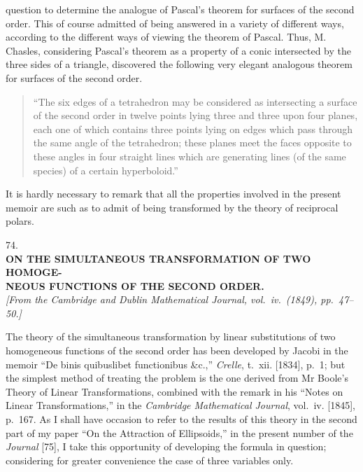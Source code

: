\documentclass[10pt]{article}
\newcommand{\qedpage}{\vfill\pagebreak}
\begin{document}
question to determine the analogue of Pascal's theorem for surfaces of the second
order. This of course admitted of being answered in a variety of different ways,
according to the different ways of viewing the theorem of Pascal. Thus, M. Chasles,
considering Pascal's theorem as a property of a conic intersected by the three sides
of a triangle, discovered the following very elegant analogous theorem for surfaces of
the second order.

\begin{quote}
``The six edges of a tetrahedron may be considered as intersecting a surface of the
second order in twelve points lying three and three upon four planes, each one of
which contains three points lying on edges which pass through the same angle of the
tetrahedron; these planes meet the faces opposite to these angles in four straight
lines which are generating lines (of the same species) of a certain hyperboloid.''
\end{quote}

It is hardly necessary to remark that all the properties involved in the present
memoir are such as to admit of being transformed by the theory of reciprocal polars.
\qedpage

\begin{center}
{\Large 74.}\\[2em]
{\large\bfseries ON THE SIMULTANEOUS TRANSFORMATION OF TWO HOMOGE-}\\
{\large\bfseries NEOUS FUNCTIONS OF THE SECOND ORDER.}\\[1.5em]
\textit{[From the Cambridge and Dublin Mathematical Journal, vol.\ iv.\ (1849),
pp.~47--50.]}
\end{center}

The theory of the simultaneous transformation by linear substitutions of two
homogeneous functions of the second order has been developed by Jacobi in the memoir
``De binis quibuslibet functionibus \&c.,'' \textit{Crelle}, t.~xii. [1834], p.~1; but the
simplest method of treating the problem is the one derived from Mr Boole's Theory of
Linear Transformations, combined with the remark in his ``Notes on Linear
Transformations,'' in the \textit{Cambridge Mathematical Journal}, vol.~iv. [1845],
p.~167. As I shall have occasion to refer to the results of this theory in the second
part of my paper ``On the Attraction of Ellipsoids,'' in the present number of the
\textit{Journal} [75], I take this opportunity of developing the formula in question;
considering for greater convenience the case of three variables only.
\end{document}
